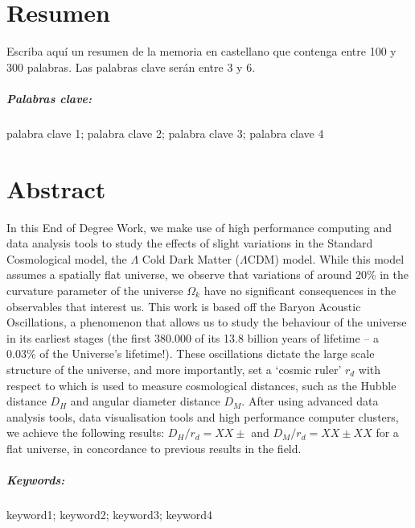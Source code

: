 \chapter*{Resumen}

Escriba aquí un resumen de la memoria en castellano que contenga entre 100 y 300 palabras. Las palabras clave serán entre 3 y 6.

\paragraph{Palabras clave:} palabra clave 1; palabra clave 2; palabra clave 3; palabra clave 4 









\chapter*{Abstract}


In this End of Degree Work, we make use of high performance computing and data analysis tools to study the effects of slight variations in the Standard Cosmological model, the $\Lambda$ Cold Dark Matter ($\Lambda$CDM) model. While this model assumes a spatially flat universe, we observe that variations of around 20\% in the curvature parameter of the universe $\Omega_k$ have no significant consequences in the observables that interest us.
This work is based off the Baryon Acoustic Oscillations, a phenomenon that allows us to study the behaviour of the universe in its earliest stages (the first 380.000 of its 13.8 billion years of lifetime -- a 0.03\% of the Universe's lifetime!). These oscillations dictate the large scale structure of the universe, and more importantly, set a `cosmic ruler' $r_d$ with respect to which is used to measure cosmological distances, such as the Hubble distance $D_H$ and angular diameter distance $D_M$.
After using advanced data analysis tools, data visualisation tools and high performance computer clusters, we achieve the following results: $D_H/r_d = XX\pm$ and $D_M /r_d = XX \pm XX$ for a flat universe, in concordance to previous results in the field. 





\paragraph{Keywords:} keyword1; keyword2; keyword3; keyword4
